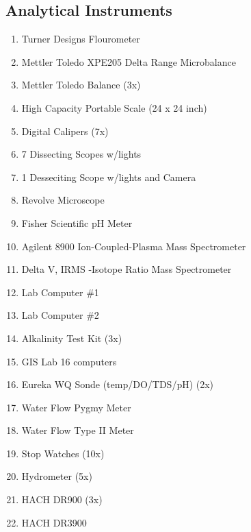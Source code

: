 \documentclass[12pt]{../SOP4_alpha}\usepackage[]{graphicx}\usepackage[]{xcolor}
\begin{document}
\subsection{Analytical Instruments}
\begin{enumerate}
  \item Turner Designs Flourometer
  \item Mettler Toledo XPE205 Delta Range Microbalance
  \item Mettler Toledo Balance (3x)
  \item High Capacity Portable Scale (24 x 24 inch)
  \item Digital Calipers (7x)
  \item 7 Dissecting Scopes w/lights
  \item 1 Desseciting Scope w/lights and Camera
  \item Revolve Microscope
  \item Fisher Scientific pH Meter
  \item Agilent 8900 Ion-Coupled-Plasma Mass Spectrometer
  \item Delta V, IRMS -Isotope Ratio Mass Spectrometer
  \item Lab Computer \#1
  \item Lab Computer \#2
  \item Alkalinity Test Kit (3x)
  \item GIS Lab 16 computers
  \item Eureka WQ Sonde (temp/DO/TDS/pH) (2x)
  \item Water Flow Pygmy Meter
  \item Water Flow Type II Meter
  \item Stop Watches (10x)
  \item Hydrometer (5x)
  \item HACH DR900 (3x)
  \item HACH DR3900
\end{enumerate}
\end{document}
